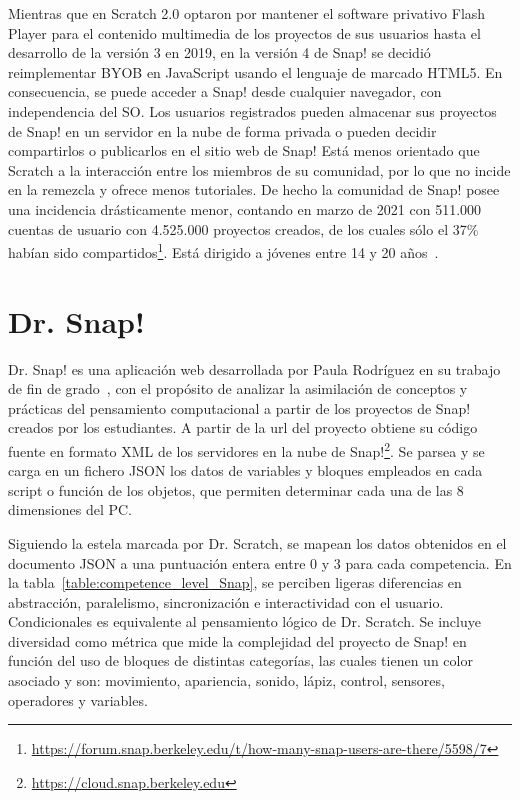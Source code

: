 \documentclass[a4paper, 12pt]{book}
\begin{document}
Mientras que en Scratch 2.0 optaron por mantener el software privativo Flash Player para el contenido multimedia de los proyectos de sus usuarios hasta el desarrollo de la versión 3 en 2019, en la versión 4 de Snap! se decidió reimplementar BYOB en JavaScript usando el lenguaje de marcado HTML5. En consecuencia, se puede acceder a Snap! desde cualquier navegador, con independencia del SO. Los usuarios registrados pueden almacenar sus proyectos de Snap! en un servidor en la nube de forma privada o pueden decidir compartirlos o publicarlos en el sitio web de Snap! Está menos orientado que Scratch a la interacción entre los miembros de su comunidad, por lo que no incide en la remezcla y ofrece menos tutoriales. De hecho la comunidad de Snap! posee una incidencia drásticamente menor, contando en marzo de 2021 con 511.000 cuentas de usuario con 4.525.000 proyectos creados, de los cuales sólo el 37\% habían sido compartidos\footnote{\url{https://forum.snap.berkeley.edu/t/how-many-snap-users-are-there/5598/7}}. Está dirigido a jóvenes entre 14 y 20 años~\cite{harvey2013snap}. %
 
\section{Dr. Snap!}
\label{sec:dr_snap}

Dr. Snap! es una aplicación web desarrollada por Paula Rodríguez en su trabajo de fin de grado~\cite{martinez2021dr}, con el propósito de analizar la asimilación de conceptos y prácticas del pensamiento computacional a partir de los proyectos de Snap! creados por los estudiantes. A partir de la url del proyecto obtiene su código fuente en formato XML de los servidores en la nube de Snap!\footnote{\url{https://cloud.snap.berkeley.edu}}. Se parsea y se carga en un fichero JSON los datos de variables y bloques empleados en cada script o función de los objetos, que permiten determinar cada una de las 8 dimensiones del PC.

Siguiendo la estela marcada por Dr. Scratch, se mapean los datos obtenidos en el documento JSON a una puntuación entera entre 0 y 3 para cada competencia. En la tabla~\ref{table:competence_level_Snap}, se perciben ligeras diferencias en abstracción, paralelismo, sincronización e interactividad con el usuario. Condicionales es equivalente al pensamiento lógico de Dr. Scratch. Se incluye diversidad como métrica que mide la complejidad del proyecto de Snap! en función del uso de bloques de distintas categorías, las cuales tienen un color asociado y son: movimiento, apariencia, sonido, lápiz, control, sensores, operadores y variables.
\end{document}

